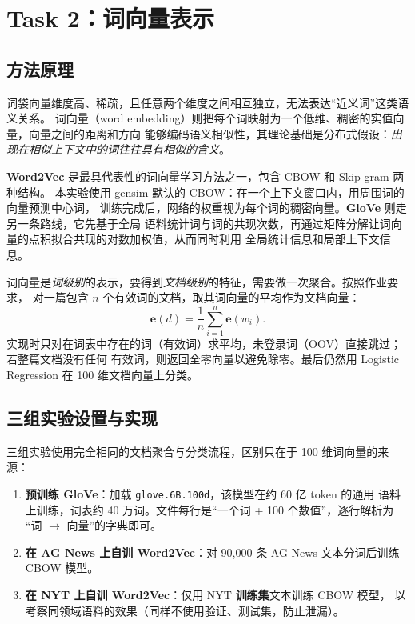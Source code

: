 \documentclass[a4paper]{article}
\begin{document}
\section{Task 2：词向量表示}
\label{sec:task2}

\subsection{方法原理}

词袋向量维度高、稀疏，且任意两个维度之间相互独立，无法表达“近义词”这类语义关系。
词向量（word embedding）则把每个词映射为一个低维、稠密的实值向量，向量之间的距离和方向
能够编码语义相似性，其理论基础是分布式假设：\emph{出现在相似上下文中的词往往具有相似的含义}。

\textbf{Word2Vec} 是最具代表性的词向量学习方法之一，包含 CBOW 和 Skip-gram 两种结构。
本实验使用 gensim 默认的 CBOW：在一个上下文窗口内，用周围词的向量预测中心词，
训练完成后，网络的权重视为每个词的稠密向量。\textbf{GloVe} 则走另一条路线，它先基于全局
语料统计词与词的共现次数，再通过矩阵分解让词向量的点积拟合共现的对数加权值，从而同时利用
全局统计信息和局部上下文信息。

词向量是\emph{词级别}的表示，要得到\emph{文档级别}的特征，需要做一次聚合。按照作业要求，
对一篇包含 $n$ 个有效词的文档，取其词向量的平均作为文档向量：
\begin{equation}
  \mathbf{e}(d) = \frac{1}{n}\sum_{i=1}^{n}\mathbf{e}(w_i).
\end{equation}
实现时只对在词表中存在的词（有效词）求平均，未登录词（OOV）直接跳过；若整篇文档没有任何
有效词，则返回全零向量以避免除零。最后仍然用 Logistic Regression 在 100 维文档向量上分类。

\subsection{三组实验设置与实现}

三组实验使用完全相同的文档聚合与分类流程，区别只在于 100 维词向量的来源：
\begin{enumerate}[(1)]
  \item \textbf{预训练 GloVe}：加载 \texttt{glove.6B.100d}，该模型在约 60 亿 token 的通用
        语料上训练，词表约 40 万词。文件每行是“一个词 + 100 个数值”，逐行解析为
        “词 $\rightarrow$ 向量”的字典即可。
  \item \textbf{在 AG News 上自训 Word2Vec}：对 90{,}000 条 AG News 文本分词后训练
        CBOW 模型。
  \item \textbf{在 NYT 上自训 Word2Vec}：仅用 NYT \textbf{训练集}文本训练 CBOW 模型，
        以考察同领域语料的效果（同样不使用验证、测试集，防止泄漏）。
\end{enumerate}
\end{document}
